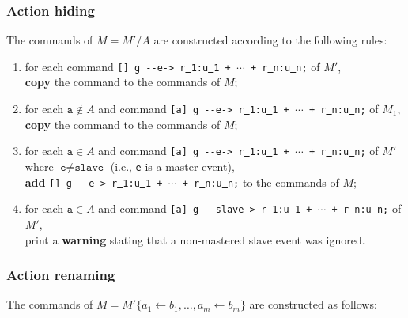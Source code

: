 \documentclass{article}
\newcommand{\arci}[1]{{-}{-}{#1}->}
\renewcommand{\_}{\underline{~}}
\newcommand{\code}[1]{\texttt{#1}}
\begin{document}
\subsubsection*{Action hiding}

The commands of $M = M'/A$ are constructed according to the following rules:

\begin{enumerate}
	
	\item for each command \code{[] g \arci{e} r\_1:u\_1 + $\cdots$ + r\_n:u\_n;} of $M'$, \\ 
	\textbf{copy} the command to the commands of $M$;
	
    \item for each $\code{a} \not\in A$ and command \code{[a] g \arci{e}  r\_1:u\_1 + $\cdots$ + r\_n:u\_n;} of $M_1$, \\ 
	\textbf{copy} the command to the commands of $M$;
	
	\item for each $\code{a} \in A$ and command \code{[a] g \arci{e}  r\_1:u\_1 + $\cdots$ + r\_n:u\_n;} of $M'$ where $\code{e} \neq \code{slave}$ (i.e., \code{e} is a master event), \\
\textbf{add} \code{[] g \arci{e}  r\_1:u\_1 + $\cdots$ + r\_n:u\_n;} to the commands of $M$;

    \item\label{it:non-mastered-slave} for each $\code{a} \in A$ and command \code{[a] g \arci{slave}  r\_1:u\_1 + $\cdots$ + r\_n:u\_n;} of $M'$, \\ print a \textbf{warning} stating that a non-mastered slave event was ignored.
\end{enumerate}

\subsubsection*{Action renaming}

The commands of $M= M'\{a_1 \leftarrow b_1, \ldots, a_m \leftarrow b_m \}$ are constructed as follows:
\end{document}
